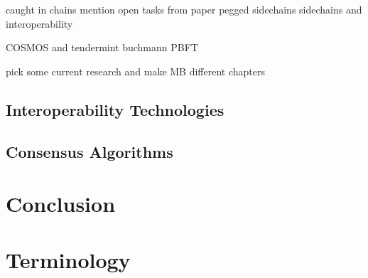 caught in chains mention open tasks from paper \cite{borkowski2018caught}
pegged sidechains \cite{back2014enabling}
sidechains and interoperability \cite{johnson2019sidechains}


COSMOS \cite{kwon2018network} and tendermint \cite{kwon2014tendermint} buchmann \cite{buchman2016tendermint} PBFT \cite{castro1999practical}

pick some current research and make MB different chapters


\section{Interoperability Technologies}
\label{sec:background:interoperability}

\section{Consensus Algorithms}
\label{sec:background:consensus}


\chapter{Conclusion}
\label{ch:chapter07}


\chapter{Terminology}
\label{ch:chapter08}

